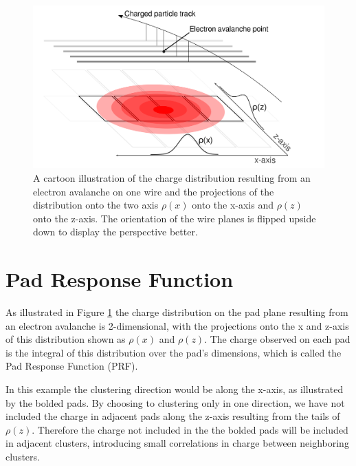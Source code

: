 \documentclass[review]{elsarticle}
\begin{document}
\begin{figure}[H]
\includegraphics[width=\linewidth]{padsat_Large}
\caption{A cartoon illustration of the charge distribution resulting from an electron avalanche on one wire and the projections of the distribution onto the two axis $\rho(x)$ onto the x-axis and $\rho(z)$ onto the z-axis. The orientation of the wire planes is flipped upside down to display the perspective better.}
\label{fig:prf}
\end{figure}

\section{Pad Response Function}
As illustrated in Figure \ref{fig:prf} the charge distribution on the pad plane resulting from an electron avalanche is 2-dimensional, with the projections onto the x and z-axis of this distribution shown as $\rho(x)$ and $\rho(z)$. The charge observed on each pad is the integral of this distribution over the pad's dimensions, which is called the Pad Response Function (PRF).

In this example the clustering direction would be along the x-axis, as illustrated by the bolded pads. By choosing to clustering only in one direction, we have not included the charge in adjacent pads along the z-axis resulting from the tails of $\rho(z)$. Therefore the charge not included in the the bolded pads will be included in adjacent clusters, introducing small correlations in charge between neighboring clusters. 
\end{document}
